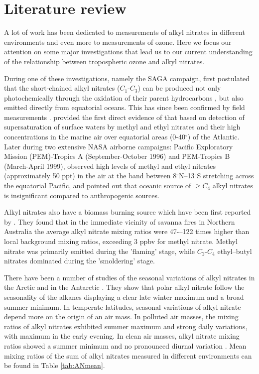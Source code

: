 \documentclass[11pt,a4paper]{article}
\begin{document}
\section{Literature review} \label{sec:lit_review}
A lot of work has been dedicated to measurements of alkyl nitrates in different environments and even more to measurements of ozone. Here we focus our attention on some major investigations that lead us to our current understanding of the relationship between tropospheric ozone and alkyl nitrates.

During one of these investigations, namely the SAGA campaign, \cite{Atlas1993} first postulated that the short-chained alkyl nitrates ($C_1$-$C_3$) can be produced not only photochemically through the oxidation of their parent hydrocarbons \citep{Roberts1990}, but also emitted directly from equatorial oceans. This has since been confirmed by field measurements \citep{Chuck2002,Blake2003,Dahl2005}. \cite{Chuck2002} provided the first direct evidence of that based on detection of supersaturation of surface waters by methyl and ethyl nitrates and their high concentrations in the marine air over equatorial areas (0-40$^{\circ}$) of the Atlantic. Later during two extensive NASA airborne campaigns: Pacific Exploratory Mission (PEM)-Tropics A (September-October 1996) and PEM-Tropics B (March-April 1999), \cite{Blake2003} observed high levels of methyl and ethyl nitrates (approximately 50 ppt) in the air at the band between 8$^{\circ}$N--13$^{\circ}$S stretching across the equatorial Pacific, and pointed out that oceanic source of $\geq C_4$ alkyl nitrates is insignificant compared to anthropogenic sources.

Alkyl nitrates also have a biomass burning source which have been first reported by \cite{Simpson2002}. They found that in the immediate vicinity of savanna fires in Northern Australia the average alkyl nitrate mixing ratios were 47-–122 times higher than local background mixing ratios, exceeding 3 ppbv for methyl nitrate. Methyl nitrate was primarily emitted during the 'flaming' stage, while $C_2$-$C_4$ ethyl--butyl nitrates dominated during the 'smoldering' stage.

There have been a number of studies of the seasonal variations of alkyl nitrates in the Arctic \citep{Swanson2003} and in the Antarctic \citep{Beyersdorf2010}. They show that polar alkyl nitrate follow the seasonality of the alkanes displaying a clear late winter maximum and a broad summer minimum. In temperate latitudes, seasonal variations of alkyl nitrate depend more on the origin of an air mass. In polluted air masses, the mixing ratios of alkyl nitrates exhibited summer maximum and strong daily variations, with maximum in the early evening. In clean air masses, alkyl nitrate mixing ratios showed a summer minimum and no pronounced diurnal variation \citep{Flocke1998}. Mean mixing ratios of the sum of alkyl nitrates measured in different environments can be found in Table \ref{tab:ANmean}.
\end{document}
